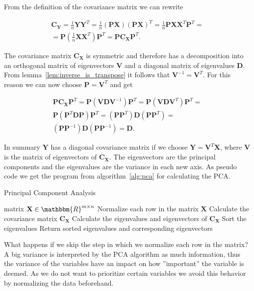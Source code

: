 \newpage
From the definition of the covariance matrix we can rewrite

\begin{align*}
	\mathbf{C}_{\mathbf{Y}} = \frac{1}{n}\mathbf{YY}^T = \frac{1}{n}(\mathbf{PX})(\mathbf{PX})^T = \frac{1}{n}\mathbf{PX}\mathbf{X}^T\mathbf{P}^T =\\
	= \mathbf{P}\left(\frac{1}{n}\mathbf{X}\mathbf{X}^T\right)\mathbf{P}^T = \mathbf{P}\mathbf{C}_\mathbf{X}\mathbf{P}^T.
\end{align*}

The covariance matrix $\mathbf{C}_\mathbf{X}$ is symmetric and therefore has a decomposition into an orthogonal matrix of eigenvectors $\mathbf{V}$ and a diagonal matrix of eigenvalues $\mathbf{D}$. From lemma~\ref{lem:inverse_is_transpose} it follows that $\mathbf{V}^{-1} = \mathbf{V}^T$.
For this reason we can now choose $\mathbf{P}=\mathbf{V}^T$ and get

\begin{align*}
	\mathbf{P}\mathbf{C}_\mathbf{X}\mathbf{P}^T = \mathbf{P}(\mathbf{VDV}^{-1})\mathbf{P}^T = \mathbf{P}(\mathbf{VDV}^{T})\mathbf{P}^T =\\
	\mathbf{P}(\mathbf{P}^T\mathbf{DP})\mathbf{P}^T = (\mathbf{P}\mathbf{P}^T)\mathbf{D}(\mathbf{P}\mathbf{P}^T) =\\
	(\mathbf{P}\mathbf{P}^{-1})\mathbf{D}(\mathbf{P}\mathbf{P}^{-1}) = \mathbf{D}.
\end{align*}

In summary $\mathbf{Y}$ has a diagonal covariance matrix if we choose $\mathbf{Y} = \mathbf{V}^T\mathbf{X}$, where $\mathbf{V}$ is the matrix of eigenvectors of $\mathbf{C}_\mathbf{X}$. The eigenvectors are the principal components and the eigenvalues are the variance in each new axis.
As pseudo code we get the program from algorithm~\ref{alg:pca} for calculating the PCA.

\begin{algorithm}
	\caption{Principal Component Analysis}\label{alg:pca}
	\begin{algorithmic}
		\Require matrix $\mathbf{X} \in \mathbbm{R}^{m\times n}$
		\State Normalize each row in the matrix $\mathbf{X}$
		\State Calculate the covariance matrix $\mathbf{C_{X}}$
		\State Calculate the eigenvalues and eigenvectors of $\mathbf{C_{X}}$
		\State Sort the eigenvalues
		\State Return sorted eigenvalues and corresponding eigenvectors
	\end{algorithmic}
\end{algorithm}

What happens if we skip the step in which we normalize each row in the matrix? A big variance is interpreted by the PCA algorithm as much information, thus the variance of the variables have an impact on how ''important'' the variable is deemed. As we do not want to prioritize certain variables we avoid this behavior by normalizing the data beforehand.